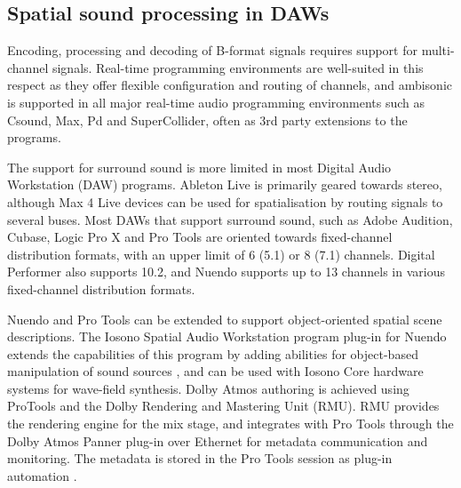 \documentclass{article}
\begin{document}
\subsection{Spatial sound processing in DAWs}\label{sec:daws}

Encoding, processing and decoding of B-format signals requires support for multi-channel signals.
Real-time programming environments are well-suited in this respect as they offer flexible configuration and routing of channels, and ambisonic is supported in all major real-time audio programming environments such as Csound, Max, Pd and SuperCollider, often as 3rd party extensions to the programs.

The support for surround sound is more limited in most Digital Audio Workstation (DAW) programs.
Ableton Live is primarily geared towards stereo, although Max 4 Live devices can be used for spatialisation by routing signals to several buses.
Most DAWs that support surround sound, such as Adobe Audition, Cubase, Logic Pro X and Pro Tools are oriented towards fixed-channel distribution formats, with an upper limit of 6 (5.1) or 8 (7.1) channels.
Digital Performer also supports 10.2, and Nuendo supports up to 13 channels in various fixed-channel distribution formats.

Nuendo and Pro Tools can be extended to support object-oriented spatial scene descriptions.
The Iosono Spatial Audio Workstation program plug-in for Nuendo extends the capabilities of this program by adding abilities for object-based manipulation of sound sources \cite{iosono2012:workstation}, and can be used with Iosono Core hardware systems for wave-field synthesis.
Dolby Atmos authoring is achieved using ProTools and the Dolby Rendering and Mastering Unit (RMU).
RMU provides the rendering engine for the mix stage, and integrates with Pro Tools through the Dolby Atmos Panner plug-in over Ethernet for metadata communication and monitoring. 
The metadata is stored in the Pro Tools session as plug-in automation \cite{dolby:2013authoring}.
\end{document}
